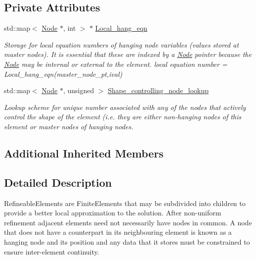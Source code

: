 \subsection*{Private Attributes}
\begin{DoxyCompactItemize}
\item 
std\+::map$<$ \hyperlink{classoomph_1_1Node}{Node} $\ast$, int $>$ $\ast$ \hyperlink{classoomph_1_1RefineableElement_aab6539936853edb8adbdf4ef0f4fd04e}{Local\+\_\+hang\+\_\+eqn}
\begin{DoxyCompactList}\small\item\em Storage for local equation numbers of hanging node variables (values stored at master nodes). It is essential that these are indexed by a \hyperlink{classoomph_1_1Node}{Node} pointer because the \hyperlink{classoomph_1_1Node}{Node} may be internal or external to the element. local equation number = Local\+\_\+hang\+\_\+eqn(master\+\_\+node\+\_\+pt,ival) \end{DoxyCompactList}\item 
std\+::map$<$ \hyperlink{classoomph_1_1Node}{Node} $\ast$, unsigned $>$ \hyperlink{classoomph_1_1RefineableElement_abe7c83069bd7798d1667b1926f9bc028}{Shape\+\_\+controlling\+\_\+node\+\_\+lookup}
\begin{DoxyCompactList}\small\item\em Lookup scheme for unique number associated with any of the nodes that actively control the shape of the element (i.\+e. they are either non-\/hanging nodes of this element or master nodes of hanging nodes. \end{DoxyCompactList}\end{DoxyCompactItemize}
\subsection*{Additional Inherited Members}


\subsection{Detailed Description}
Refineable\+Elements are Finite\+Elements that may be subdivided into children to provide a better local approximation to the solution. After non-\/uniform refinement adjacent elements need not necessarily have nodes in common. A node that does not have a counterpart in its neighbouring element is known as a hanging node and its position and any data that it stores must be constrained to ensure inter-\/element continuity.

